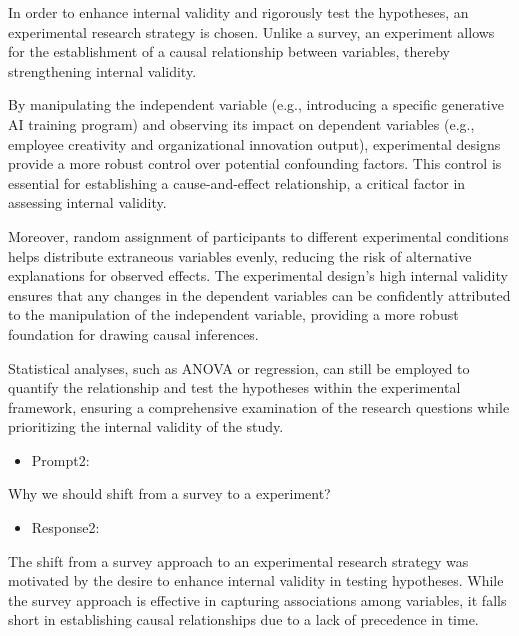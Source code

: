 \documentclass[UTF8,a4paper,AutoFakeBold,AutoFakeSlant]{article}
\begin{document}
In order to enhance internal validity and rigorously test the hypotheses, an experimental research strategy is chosen. Unlike a survey, an experiment allows for the establishment of a causal relationship between variables, thereby strengthening internal validity.

By manipulating the independent variable (e.g., introducing a specific generative AI training program) and observing its impact on dependent variables (e.g., employee creativity and organizational innovation output), experimental designs provide a more robust control over potential confounding factors. This control is essential for establishing a cause-and-effect relationship, a critical factor in assessing internal validity.

Moreover, random assignment of participants to different experimental conditions helps distribute extraneous variables evenly, reducing the risk of alternative explanations for observed effects. The experimental design's high internal validity ensures that any changes in the dependent variables can be confidently attributed to the manipulation of the independent variable, providing a more robust foundation for drawing causal inferences.

Statistical analyses, such as ANOVA or regression, can still be employed to quantify the relationship and test the hypotheses within the experimental framework, ensuring a comprehensive examination of the research questions while prioritizing the internal validity of the study.

\begin{itemize}
    \item Prompt2:
\end{itemize}

Why we should shift from a survey to a experiment?

\begin{itemize}
    \item Response2:
\end{itemize}

The shift from a survey approach to an experimental research strategy was motivated by the desire to enhance internal validity in testing hypotheses. While the survey approach is effective in capturing associations among variables, it falls short in establishing causal relationships due to a lack of precedence in time.



% 
% 
% 
\end{document}
